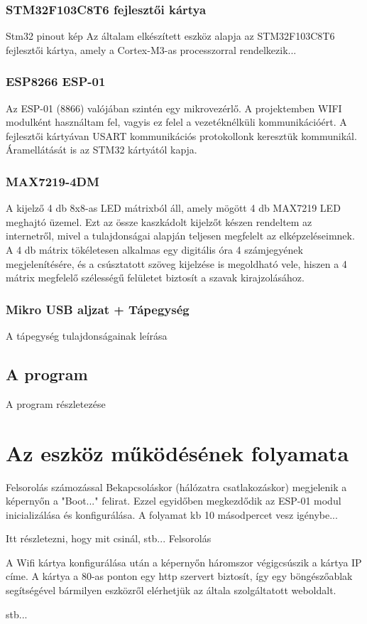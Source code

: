\documentclass[a4paper, 12pt]{article}
\begin{document}
\subsubsection{STM32F103C8T6 fejlesztői kártya}
Stm32 pinout kép
Az általam elkészített eszköz alapja az STM32F103C8T6 fejlesztői kártya, amely a Cortex-M3-as processzorral rendelkezik...

\subsubsection{ESP8266 ESP-01}
Az ESP-01 (8866) valójában szintén egy mikrovezérlő. A projektemben WIFI modulként használtam fel, vagyis ez felel a vezetéknélküli kommunikációért. A fejlesztői kártyávan USART kommunikációs protokollonk keresztük kommunikál. Áramellátását is az STM32 kártyától kapja. 

\subsubsection{MAX7219-4DM}
A kijelző 4 db 8x8-as LED mátrixból áll, amely mögött 4 db MAX7219 LED meghajtó üzemel. Ezt az össze kaszkádolt kijelzőt készen rendeltem az internetről, mivel a tulajdonságai alapján teljesen megfelelt az elképzeléseimnek. A 4 db mátrix tökéletesen alkalmas egy digitális óra 4 számjegyének megjelenítésére, és a csúsztatott szöveg kijelzése is megoldható vele, hiszen a 4 mátrix megfelelő szélességű felületet biztosít a szavak kirajzolásához.

\subsubsection{Mikro USB aljzat + Tápegység}
A tápegység tulajdonságainak leírása

\subsection{A program}
A program részletezése

\section{Az eszköz működésének folyamata}
Felsorolás számozással
Bekapcsoláskor (hálózatra csatlakozáskor) megjelenik a képernyőn a "Boot..." felirat. Ezzel egyidőben megkezdődik az ESP-01 modul inicializálása és konfigurálása.
A folyamat kb 10 másodpercet vesz igénybe...

Itt részletezni, hogy mit csinál, stb...
Felsorolás

A Wifi kártya konfigurálása után a képernyőn háromszor végigcsúszik a kártya IP címe.
A kártya a 80-as ponton egy http szervert biztosít, így egy böngészőablak segítségével bármilyen eszközről elérhetjük az általa szolgáltatott weboldalt.

stb...
\end{document}
